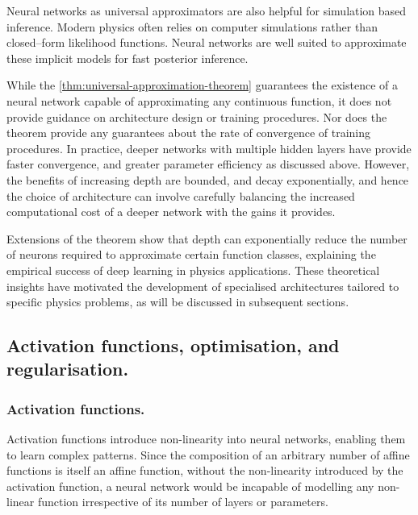             Neural networks as universal approximators are also helpful for simulation based inference.
            Modern physics often relies on computer simulations rather than closed--form likelihood functions.
            Neural networks are well suited to approximate these implicit models for fast posterior inference.

            While the \cref{thm:universal-approximation-theorem} guarantees the existence of a neural network capable of approximating any continuous function, it does not provide guidance on architecture design or training procedures.
            Nor does the theorem provide any guarantees about the rate of convergence of training procedures.
            In practice, deeper networks with multiple hidden layers have provide faster convergence, and greater parameter efficiency as discussed above.
            However, the benefits of increasing depth are bounded, and decay exponentially, and hence the choice of architecture can involve carefully balancing the increased computational cost of a deeper network with the gains it provides.
            
            Extensions of the theorem show that depth can exponentially reduce the number of neurons required to approximate certain function classes, explaining the empirical success of deep learning in physics applications.
            These theoretical insights have motivated the development of specialised architectures tailored to specific physics problems, as will be discussed in subsequent sections.
    \subsection{Activation functions, optimisation, and regularisation.}
        \subsubsection{Activation functions.}
            Activation functions introduce non-linearity into neural networks, enabling them to learn complex patterns.
            Since the composition of an arbitrary number of affine functions is itself an affine function, without the non-linearity introduced by the activation function, a neural network would be incapable of modelling any non-linear function irrespective of its number of layers or parameters.
            
